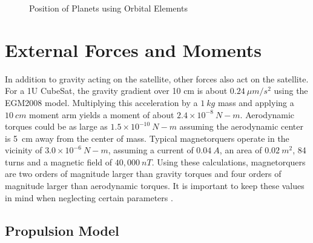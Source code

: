 \documentclass{article}
\begin{document}
\begin{figure}[H]
\begin{center}
\begin{tabular}{cc}
  \end{tabular}
  \end{center}
  \caption{Position of Planets using Orbital Elements}
\end{figure}

\section{External Forces and Moments}

In addition to gravity acting on the satellite, other forces also act
on the satellite. For a 1U CubeSat, the gravity gradient over 10 cm is about
$0.24~\mu m/s^2$ using the EGM2008 model. Multiplying this 
acceleration by a $1~kg$ mass and applying a $10~cm$ moment arm yields
a moment of about $2.4 \times 10^{-8}~N-m$. Aerodynamic torques could
be as large as $1.5 \times 10^{-10}~N-m$ assuming the aerodynamic
center is 5~cm away from the center of mass. Typical magnetorquers operate
in the vicinity of $3.0 \times 10^{-6}~N-m$, assuming a current of $0.04~A$, an area of
$0.02~m^2$, 84 turns and a magnetic field of $40,000~nT$. Using
these calculations, magnetorquers are two orders of magnitude
larger than gravity torques and four orders of magnitude larger than
aerodynamic torques. It is important to keep these values in mind when
neglecting certain parameters \cite{Radiation,AndersonD,Density_Model}.

\subsection{Propulsion Model}
\end{document}
